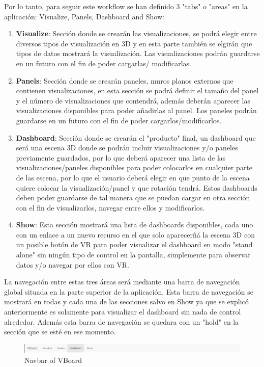 \documentclass[a4paper, 12pt]{book}
\begin{document}
Por lo tanto, para seguir este workflow se han definido 3 "tabs" o "areas" en la aplicación: Visualize, Panels, Dashboard and Show:
\begin{enumerate}
    \item \textbf{Visualize}: Sección donde se crearán las visualizaciones, se podrá elegir entre diversos tipos de visualización en 3D y en esta parte también se elgirán que tipos de datos mostrará la visualización. Las visualizaciones podrán guardarse en un futuro con el fin de poder cargarlas/ modificarlas.
    \item \textbf{Panels}: Sección donde se crearán paneles, muros planos externos que contienen visualizaciones, en esta sección se podrá definir el tamaño del panel y el número de visualizaciones que contendrá, además deberán aparecer las visualizaciones disponibles para poder añadirlas al panel. Los paneles podrán guardarse en un futuro con el fin de poder cargarlos/modificarlos.
    \item \textbf{Dashboard}: Sección donde se crearán el "producto" final, un dashboard que será una escena 3D donde se podrán incluir visualizaciones y/o paneles previamente guardados, por lo que deberá aparecer una lista de las visualizaciones/paneles disponibles para poder colocarlos en cualquier parte de las escena, por lo que el usuario deberá elegir en que punto de la escena quiere colocar la visualización/panel y que rotación tendrá. Estos dashboards deben poder guardarse de tal manera que se puedan cargar en otra sección con el fin de visualizarlos, navegar entre ellos y modificarlos.
    \item \textbf{Show}: Esta sección mostrará una lista de dashboards disponibles, cada uno con un enlace a un nuevo recurso en el que solo aparecerñá la escena 3D con un posible botón de VR para poder visualizar el dashboard en modo "stand alone" sin ningún tipo de control en la pantalla, simplemente para observar datos y/o navegar por ellos con VR.
\end{enumerate}

La navegación entre estas tres áreas será mediante una barra de navegación global situada en la parte superior de la aplicación. Esta barra de navegación se mostrará en todas y cada una de las secciones salvo en Show ya que se explicó anteriormente es solamente para visualizar el dashboard sin nada de control alrededor. Además esta barra de navegación se quedara con un "hold" en la sección que se esté en ese momento.

\begin{figure}[H]
  \centering
  \includegraphics[width=16cm, keepaspectratio]{img/development/navbar}
  \caption{Navbar of VBoard}
  \label{fig:pluginhtml}
\end{figure}
\end{document}
